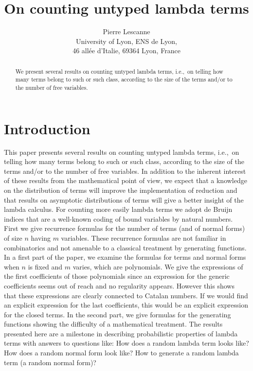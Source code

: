 \documentclass[preprint,authoryear]{elsarticle}
\title{On counting untyped lambda terms}
\author{Pierre Lescanne\\
University of Lyon, ENS de Lyon, \\
46 all\'ee d'Italie, 69364 Lyon, France}
\newcommand{\ie}{i.e.,~}
\begin{document}
\ifElsev \else 
\date{}
\maketitle 
\pagestyle{plain}
\thispagestyle{empty}
 \fi

 \begin{abstract}
   We present several results on counting untyped lambda terms, \ie on telling
   how many terms belong to such or such class, according to the
   size of the terms and/or to the number of free variables.  
 \end{abstract}

\section{Introduction}
\label{sec:introduction}

This paper presents several results on counting untyped lambda terms, \ie on telling how
many terms belong to such or such class, according to the size of the terms and/or to the
number of free variables.  In addition to the inherent interest of these results from the
mathematical point of view, we expect that a knowledge on the distribution of terms will
improve the implementation of reduction and that results on asymptotic distributions of
terms will give a better insight of the lambda calculus.  For counting more easily lambda
terms we adopt de Bruijn indices that are a well-known coding of bound variables by
natural numbers.  First we give recurrence formulas for the number of terms (and of normal
forms) of size $n$ having $m$ variables.  These recurrence formulas are not familiar in
combinatorics and not amenable to a classical treatment by generating functions.  In a
first part of the paper, we examine the formulas for terms and normal forms when $n$ is
fixed and $m$ varies, which are polynomials. We give the expressions of the first
coefficients of those polynomials since an expression for the generic coefficients seems
out of reach and no regularity appears.  However this shows that these expressions are
clearly connected to Catalan numbers. If we would find an explicit expression for the
last coefficients, this would be an explicit expression for the closed terms.  In the
second part, we give formulas for the generating functions showing the difficulty of a
mathematical treatment.  The results presented here are a milestone in describing
probabilistic properties of lambda terms with answers to questions like: How does a random
lambda term looks like? How does a random normal form look like?  How to generate a random
lambda term (a random normal form)?
\end{document}
